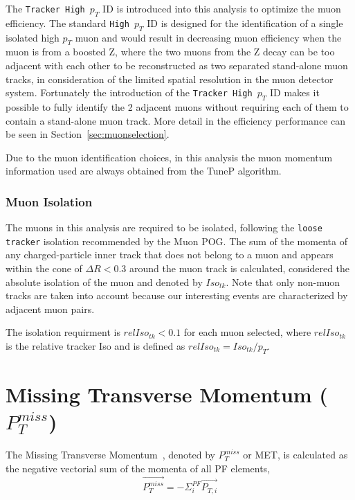 The \texttt{Tracker High $p_T$} ID is introduced into this analysis to optimize the muon efficiency. The standard \texttt{High $p_T$} ID is designed for the identification of a single isolated high $p_T$ muon and would result in decreasing muon efficiency when the muon is from a boosted Z, where the two muons from the Z decay can be too adjacent with each other to be reconstructed as two separated stand-alone muon tracks, in consideration of the limited spatial resolution in the muon detector system. Fortunately the introduction of the \texttt{Tracker High $p_T$} ID makes it possible to fully identify the 2 adjacent muons without requiring each of them to contain a stand-alone muon track. More detail in the efficiency performance can be seen in Section~\ref{sec:muonselection}.

\vspace{0.3cm}
Due to the muon identification choices, in this analysis the muon momentum information used are always obtained from the TuneP algorithm.

\subsubsection{Muon Isolation}
The muons in this analysis are required to be isolated, following the \texttt{loose tracker} isolation recommended by the Muon POG. The sum of the momenta of any charged-particle inner track that does not belong to a muon and appears within the cone of $\Delta R<0.3$ around the muon track is calculated, considered the absolute isolation of the muon and denoted by $Iso_{tk}$. Note that only non-muon tracks are taken into account because our interesting events are characterized by adjacent muon pairs.

\vspace{0.3cm}
The isolation requirment is $relIso_{tk}<0.1$ for each muon selected, where $relIso_{tk}$ is the relative tracker Iso and is defined as $relIso_{tk}=Iso_{tk}/p_{T}$.

\section{Missing Transverse Momentum ($P_T ^{miss}$)}
The Missing Transverse Momentum~\cite{ob_metconst}, denoted by $P_T ^{miss}$ or MET, is calculated as the negative vectorial sum of the momenta of all PF elements,
\begin{equation}
\vec{P_T ^{miss}} = -\Sigma_{i}^{PF} \vec{P_{T,i}}
\label{eqn:ob_metdef}
\end{equation}


